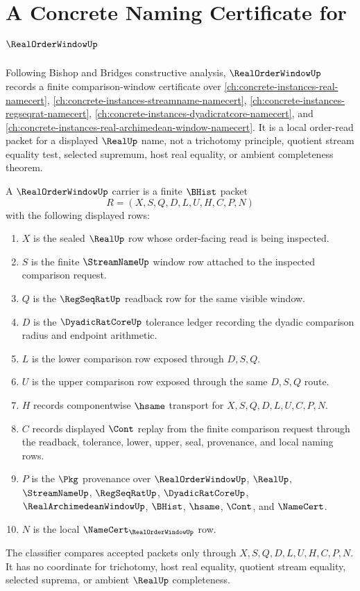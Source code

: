 \chapter{A Concrete Naming Certificate for $\RealOrderWindowUp$}
\label{ch:concrete-instances-real-order-window-namecert}

Following Bishop and Bridges constructive analysis, $\RealOrderWindowUp$ records a finite comparison-window certificate over \autoref{ch:concrete-instances-real-namecert}, \autoref{ch:concrete-instances-streamname-namecert}, \autoref{ch:concrete-instances-regseqrat-namecert}, \autoref{ch:concrete-instances-dyadicratcore-namecert}, and \autoref{ch:concrete-instances-real-archimedean-window-namecert}. It is a local order-read packet for a displayed $\RealUp$ name, not a trichotomy principle, quotient stream equality test, selected supremum, host real equality, or ambient completeness theorem.

\begin{definition}
\label{def:real-order-window-carrier}
A $\RealOrderWindowUp$ carrier is a finite $\BHist$ packet
$$
R=(X,S,Q,D,L,U,H,C,P,N)
$$
with the following displayed rows:
\begin{enumerate}
\item $X$ is the sealed $\RealUp$ row whose order-facing read is being inspected.
\item $S$ is the finite $\StreamNameUp$ window row attached to the inspected comparison request.
\item $Q$ is the $\RegSeqRatUp$ readback row for the same visible window.
\item $D$ is the $\DyadicRatCoreUp$ tolerance ledger recording the dyadic comparison radius and endpoint arithmetic.
\item $L$ is the lower comparison row exposed through $D,S,Q$.
\item $U$ is the upper comparison row exposed through the same $D,S,Q$ route.
\item $H$ records componentwise $\hsame$ transport for $X,S,Q,D,L,U,C,P,N$.
\item $C$ records displayed $\Cont$ replay from the finite comparison request through the readback, tolerance, lower, upper, seal, provenance, and local naming rows.
\item $P$ is the $\Pkg$ provenance over $\RealOrderWindowUp$, $\RealUp$, $\StreamNameUp$, $\RegSeqRatUp$, $\DyadicRatCoreUp$, $\RealArchimedeanWindowUp$, $\BHist$, $\hsame$, $\Cont$, and $\NameCert$.
\item $N$ is the local $\NameCert_{\RealOrderWindowUp}$ row.
\end{enumerate}
The classifier compares accepted packets only through $X,S,Q,D,L,U,H,C,P,N$. It has no coordinate for trichotomy, host real equality, quotient stream equality, selected suprema, or ambient $\RealUp$ completeness.
\end{definition}

